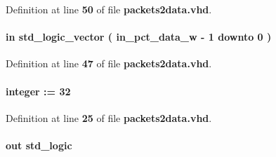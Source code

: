 Definition at line {\bf 50} of file {\bf packets2data.\+vhd}.

\paragraph[{in\+\_\+pct\+\_\+data}]{ {\bfseries \textcolor{keywordflow}{in}\textcolor{vhdlchar}{ }} {\bfseries \textcolor{comment}{std\+\_\+logic\+\_\+vector}\textcolor{vhdlchar}{ }\textcolor{vhdlchar}{(}\textcolor{vhdlchar}{ }\textcolor{vhdlchar}{ }\textcolor{vhdlchar}{ }\textcolor{vhdlchar}{ }{\bfseries {\bf in\+\_\+pct\+\_\+data\+\_\+w}} \textcolor{vhdlchar}{-\/}\textcolor{vhdlchar}{ } \textcolor{vhdldigit}{1} \textcolor{vhdlchar}{ }\textcolor{keywordflow}{downto}\textcolor{vhdlchar}{ }\textcolor{vhdlchar}{ } \textcolor{vhdldigit}{0} \textcolor{vhdlchar}{ }\textcolor{vhdlchar}{)}\textcolor{vhdlchar}{ }} \hspace{0.3cm}{\ttfamily [Port]}}\label{classpackets2data_aedf5f7fe5cea9eafd5e8a7b477065c1c}


Definition at line {\bf 47} of file {\bf packets2data.\+vhd}.

\paragraph[{in\+\_\+pct\+\_\+data\+\_\+w}]{ {\bfseries \textcolor{vhdlchar}{ }} {\bfseries \textcolor{comment}{integer}\textcolor{vhdlchar}{ }\textcolor{vhdlchar}{ }\textcolor{vhdlchar}{\+:}\textcolor{vhdlchar}{=}\textcolor{vhdlchar}{ }\textcolor{vhdlchar}{ } \textcolor{vhdldigit}{32} \textcolor{vhdlchar}{ }} \hspace{0.3cm}{\ttfamily [Generic]}}\label{classpackets2data_a95676500d5b1dd663594499d9fcca396}


Definition at line {\bf 25} of file {\bf packets2data.\+vhd}.

\paragraph[{in\+\_\+pct\+\_\+full}]{ {\bfseries \textcolor{keywordflow}{out}\textcolor{vhdlchar}{ }} {\bfseries \textcolor{comment}{std\+\_\+logic}\textcolor{vhdlchar}{ }} \hspace{0.3cm}{\ttfamily [Port]}}\label{classpackets2data_a178b9d9b3d5e363493d32dbceb85b15a}


